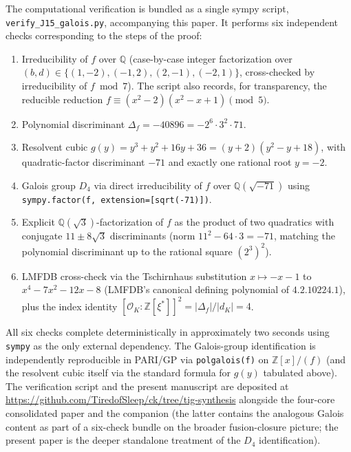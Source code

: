 \documentclass[11pt,reqno]{amsart}
\theoremstyle{plain}
\theoremstyle{definition}
\theoremstyle{remark}
\newcommand{\Q}{\mathbb{Q}}
\newcommand{\Z}{\mathbb{Z}}
\begin{document}
The computational verification is bundled as a single sympy script,
\texttt{verify\_J15\_galois.py}, accompanying this paper. It performs
six independent checks corresponding to the steps of the proof:
\begin{enumerate}\setlength\itemsep{0pt}
\item Irreducibility of $f$ over $\Q$ (case-by-case integer
  factorization over $(b, d) \in \{(1,-2), (-1,2), (2,-1), (-2,1)\}$,
  cross-checked by irreducibility of $f \bmod 7$). The script also
  records, for transparency, the reducible reduction
  $f \equiv (x^{2} - 2)(x^{2} - x + 1) \pmod 5$.
\item Polynomial discriminant $\Delta_{f} = -40896 = -2^{6}\cdot 3^{2}
  \cdot 71$.
\item Resolvent cubic $g(y) = y^{3} + y^{2} + 16y + 36 = (y+2)
  (y^{2} - y + 18)$, with quadratic-factor discriminant $-71$ and
  exactly one rational root $y = -2$.
\item Galois group $D_{4}$ via direct irreducibility of $f$ over
  $\Q(\sqrt{-71})$ using \texttt{sympy.factor(f, extension=[sqrt(-71)])}.
\item Explicit $\Q(\sqrt{3})$-factorization of $f$ as the product of
  two quadratics with conjugate $11 \pm 8\sqrt{3}$ discriminants
  (norm $11^{2} - 64\cdot 3 = -71$, matching the polynomial
  discriminant up to the rational square $(2^{3})^{2}$).
\item LMFDB cross-check via the Tschirnhaus substitution
  $x \mapsto -x - 1$ to $x^{4} - 7x^{2} - 12x - 8$ (LMFDB's canonical
  defining polynomial of $4.2.10224.1$), plus the index identity
  $[\mathcal{O}_{K} : \Z[\xi^{*}]]^{2} = |\Delta_{f}|/|d_{K}| = 4$.
\end{enumerate}

All six checks complete deterministically in approximately two seconds
using \texttt{sympy} as the only external dependency. The Galois-group
identification is independently reproducible in PARI/GP via
\texttt{polgalois(f)} on $\Z[x]/(f)$ (and the resolvent cubic itself
via the standard formula for $g(y)$ tabulated above). The verification
script and the present manuscript are deposited at
\url{https://github.com/TiredofSleep/ck/tree/tig-synthesis} alongside
the four-core consolidated paper \cite{SandersGishFourCore} and the
companion \cite{SandersGishFourCoreJalg} (the latter contains the
analogous Galois content as part of a six-check bundle on the broader
fusion-closure picture; the present paper is the deeper standalone
treatment of the $D_{4}$ identification).
\end{document}
